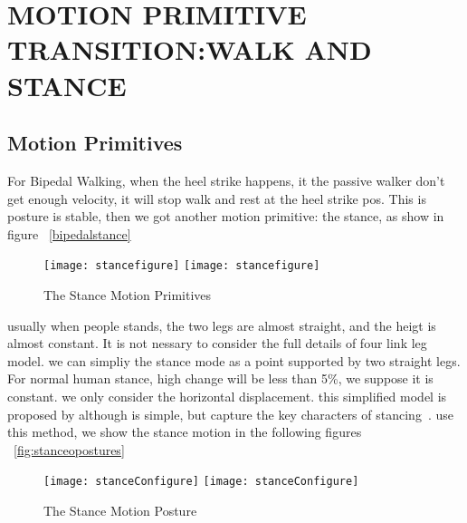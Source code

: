 
\chapter{MOTION PRIMITIVE TRANSITION:WALK AND STANCE}
\label{chap:stance}
\ifpdf
    \graphicspath{{WalkStance/WalkstanceFigs/PNG/}{WalkStance/WalkStanceFigs/PDF/}{WalkStance/WalkStanceFigs/}}
\else
    \graphicspath{{WalkStance/WalkStanceFigs/EPS/}{WalkStance/WalkStanceFigs/}}
\fi



\section{Motion Primitives}
For Bipedal Walking, when the heel strike happens, it the passive walker don't get enough velocity, it will stop walk and rest at the heel strike pos.
This is posture is stable, then we got another motion primitive: the stance, as show in figure ~\ref{bipedalstance}



\begin{figure}[!htbp]
  \begin{center}
    \leavevmode
    \ifpdf
      \texttt{[image: stancefigure]}
    \else
      \texttt{[image: stancefigure]}
    \fi
    \caption{The Stance Motion Primitives}
    \label{fig:bipedalstance}
\end{center}
\end{figure}



usually when people stands, the two legs are almost straight, and the heigt is almost constant.
It is not nessary to consider the full details of four link leg model.
we can simpliy the stance mode as a point supported by two straight legs. 
For normal human stance, high change will be less than 5\%, we suppose it is constant.
we only consider the horizontal displacement.
this simplified model is proposed by although is simple, but capture the key characters of stancing~\citep{stephens2009modeling}.
use this method, we show the stance motion in the following figures ~\ref{fig:stanceopostures}

\begin{figure}[!htbp]
  \begin{center}
    \leavevmode
    \ifpdf
      \texttt{[image: stanceConfigure]}
    \else
      \texttt{[image: stanceConfigure]}
    \fi
    \caption{The Stance Motion Posture}
    \label{fig:stancepostures}
\end{center}
\end{figure}

